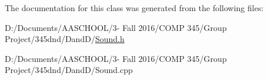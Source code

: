 The documentation for this class was generated from the following files\+:\begin{DoxyCompactItemize}
\item 
D\+:/\+Documents/\+A\+A\+S\+C\+H\+O\+O\+L/3-\/ Fall 2016/\+C\+O\+M\+P 345/\+Group Project/345dnd/\+Dand\+D/\hyperlink{_sound_8h}{Sound.\+h}\item 
D\+:/\+Documents/\+A\+A\+S\+C\+H\+O\+O\+L/3-\/ Fall 2016/\+C\+O\+M\+P 345/\+Group Project/345dnd/\+Dand\+D/Sound.\+cpp\end{DoxyCompactItemize}
